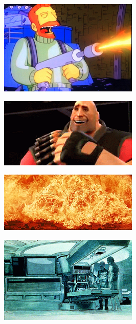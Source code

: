 \begin{figure}
	\begin{center}
		\includegraphics[width=\figwidth]{pics/6/48.png}
	\end{center}
\end{figure}

\begin{figure}
	\begin{center}
		\includegraphics[width=\figwidth]{pics/6/49.png}
	\end{center}
\end{figure}

\begin{figure}
	\begin{center}
		\includegraphics[width=\figwidth]{pics/6/50.png}
	\end{center}
\end{figure}

\begin{figure}
	\begin{center}
		\includegraphics[width=\figwidth]{pics/6/51.png}
	\end{center}
\end{figure}

